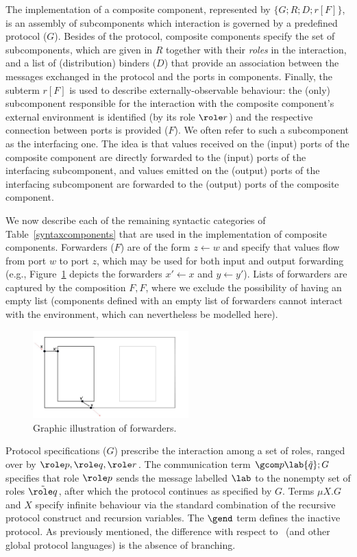 The implementation of a composite component, represented by $\{G;R;D;r[F]\}$, is an assembly of subcomponents which interaction is governed by a predefined protocol ($G$). Besides of the protocol, 
composite components specify the set of subcomponents, which are given in $R$ together with their \emph{roles} in the interaction, and a list of (distribution) binders ($D$) that provide an association between
the messages exchanged in the protocol and the ports in components. Finally, the subterm $r[F]$ is used to describe externally-observable behaviour: the (only) subcomponent responsible for the interaction with the composite component's external environment is identified (by its role $\role r$) and the respective connection between ports is provided ($F$). We often refer to such a subcomponent as the interfacing one. The idea is that values received on the (input) ports of the composite component are directly forwarded to the (input) ports of the interfacing subcomponent, and values emitted on the (output) ports of the interfacing subcomponent are forwarded to the (output) ports of the composite component. 

We now describe each of the remaining syntactic categories of Table~\ref{syntaxcomponents} that are used in the implementation of composite components.
Forwarders ($F$) are of the form $z\leftarrow w$ and specify that values flow from port $w$ to port $z$, which may be used for both input and output forwarding (e.g., Figure~\ref{forwarders} depicts the forwarders $x'\leftarrow x$ and $y\leftarrow y'$). Lists of forwarders are captured by the composition $F,F$, where we exclude the possibility of having an empty list (components defined with an empty list of forwarders cannot interact with the environment, which can nevertheless be modelled here).

\begin{figure}[t]

\includegraphics[width=6cm]{forwarders.jpg}
\centering
\caption{Graphic illustration of forwarders.
\label{forwarders}}


\end{figure}

Protocol specifications ($G$) prescribe the interaction among a set of roles, ranged over by $\role p,\role q,\role r$. The communication term $\gcom p \lab{\tilde  q};G $ specifies that role $\role p$ sends the message labelled  $\lab$  to the nonempty set of roles $\tilde{\role q}$, after which the protocol continues as specified by $G$. Terms $\mu X.G$ and $X$ specify infinite behaviour via the standard combination of the recursive protocol construct and recursion variables. The $\gend$ term defines the inactive protocol. As previously mentioned, the difference with respect to~\cite{Hugo} (and other global protocol languages) is the absence of branching.


